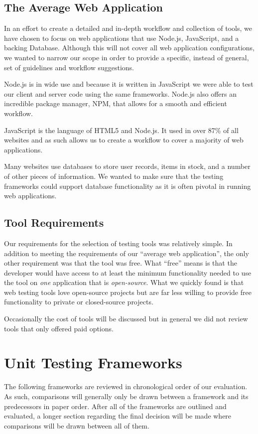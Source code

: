 \documentclass[12pt]{ucthesis}
\begin{document}
\subsection{The Average Web Application}
In an effort to create a detailed and in-depth workflow and collection of tools, we have chosen to focus on web applications that use Node.js, JavaScript, and a backing Database. Although this will not cover all web application configurations, we wanted to narrow our scope in order to provide a specific, instead of general, set of guidelines and workflow suggestions.

Node.js is in wide use and because it is written in JavaScript we were able to test our client and server code using the same frameworks. Node.js also offers an incredible package manager, NPM, that allows for a smooth and efficient workflow.

JavaScript is the language of HTML5 and Node.js. It used in over 87\% of all websites\cite{JSUsage} and as such allows us to create a workflow to cover a majority of web applications.

Many websites use databases to store user records, items in stock, and a number of other pieces of information. We wanted to make sure that the testing frameworks could support database functionality as it is often pivotal in running web applications.

\subsection{Tool Requirements}
Our requirements for the selection of testing tools was relatively simple. In addition to meeting the requirements of our ``average web application'', the only other requirement was that the tool was free. What ``free'' means is that the developer would have access to at least the minimum functionality needed to use the tool on \emph{one} application that is \emph{open-source}. What we quickly found is that web testing tools love open-source projects but are far less willing to provide free functionality to private or closed-source projects. 

Occasionally the cost of tools will be discussed but in general we did not review tools that only offered paid options.

\section{Unit Testing Frameworks}
The following frameworks are reviewed in chronological order of our evaluation. As such, comparisons will generally only be drawn between a framework and its predecessors in paper order. After all of the frameworks are outlined and evaluated, a longer section regarding the final decision will be made where comparisons will be drawn between all of them. 
\end{document}
